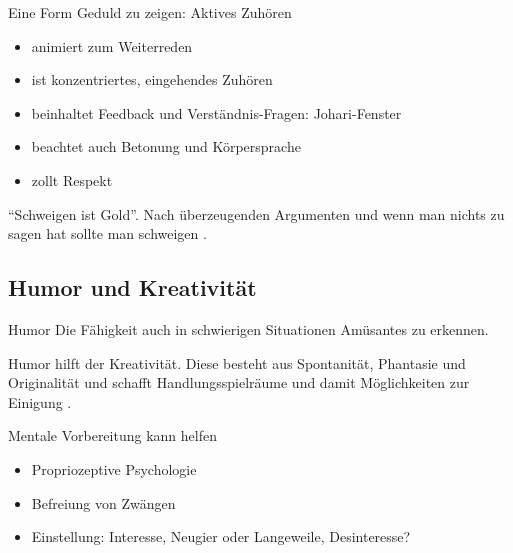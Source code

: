 \begin{frame}

  Eine Form Geduld zu zeigen: Aktives Zuhören
  
  \begin{itemize}
    \item animiert zum Weiterreden
    \item ist konzentriertes, eingehendes Zuhören
    \item beinhaltet Feedback und Verständnis-Fragen: Johari-Fenster \cite[][p. 97]{mccarthy_advanced_2015} 
    \item beachtet auch Betonung und Körpersprache
    \item zollt Respekt
  \end{itemize}
    
  \enquote{Schweigen ist Gold}. Nach überzeugenden Argumenten und wenn man nichts zu sagen hat sollte man schweigen \cites{obermeier_karrieresprung_nodate}[][ch. 4.5.2]{helmold_verhandlungskonzepte_2019}.

\end{frame}


\subsection{Humor und Kreativität}

\begin{frame}
  \begin{block}{Humor}
    Die Fähigkeit auch in schwierigen Situationen Amüsantes zu erkennen.
  \end{block}

  Humor hilft der Kreativität. Diese besteht aus Spontanität, Phantasie und Originalität und schafft Handlungsspielräume und damit Möglichkeiten zur Einigung 
   \cite[][p. 159]{wannenwetsch_schluesselfaktoren_2009}.

\end{frame}

\begin{frame}

  Mentale Vorbereitung kann helfen \cite[][p. 169f]{wannenwetsch_schluesselfaktoren_2009}

  \begin{itemize}
    \item Propriozeptive Psychologie \cite[][p. 37ff]{mccarthy_advanced_2015}
    \item Befreiung von Zwängen
    \item Einstellung: Interesse, Neugier oder Langeweile, Desinteresse?
  \end{itemize}

\end{frame}


